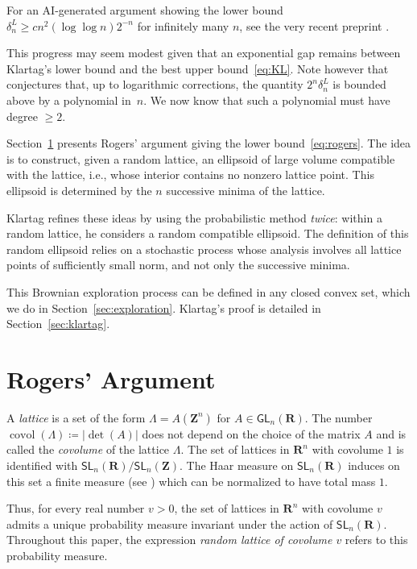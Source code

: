 \documentclass[10pt,a4paper]{amsart}
\newcommand{\R}{\mathbf{R}}
\newcommand{\Z}{\mathbf{Z}}
\newcommand{\gGL}{\mathsf{GL}}
\newcommand{\gSL}{\mathsf{SL}}
\DeclareMathOperator{\covol}{covol}
\renewcommand{\geq}{\geqslant}
\begin{document}
For an AI-generated argument showing the lower bound $\delta_n^L \geq c n^2 (\log \log n) 2^{-n}$ for infinitely many $n$, see the very recent preprint \cite{AGZ26}.

 
This progress may seem modest given that an exponential gap remains between Klartag's lower bound and the best upper bound~\eqref{eq:KL}. Note however that \cite{Venkatesh13} conjectures that, up to logarithmic corrections, the quantity $2^n \delta_n^L$ is bounded above by a polynomial in~$n$. We now know that such a polynomial must have degree $\geq 2$.
 
Section~\ref{section:rogers} presents Rogers' argument giving the lower bound~\eqref{eq:rogers}. The idea is to construct, given a random lattice, an ellipsoid of large volume compatible with the lattice, i.e., whose interior contains no nonzero lattice point. This ellipsoid is determined by the $n$ successive minima of the lattice.
 
Klartag refines these ideas by using the probabilistic method \emph{twice}: within a random lattice, he considers a random compatible ellipsoid. The definition of this random ellipsoid relies on a stochastic process whose analysis involves all lattice points of sufficiently small norm, and not only the successive minima.
 
This Brownian exploration process can be defined in any closed convex set, which we do in Section~\ref{sec:exploration}. Klartag's proof is detailed in Section~\ref{sec:klartag}.
 
 
\section{Rogers' Argument} \label{section:rogers}
 
A \emph{lattice} is a set of the form $\Lambda = A ( \Z^n)$ for $A \in \gGL_n(\R)$. The number $\covol(\Lambda) \coloneqq |\det(A)|$ does not depend on the choice of the matrix $A$ and is called the \emph{covolume} of the lattice $\Lambda$. The set of lattices in $\R^n$ with covolume $1$ is identified with $\gSL_n(\R) / \gSL_n(\Z)$. The Haar measure on $\gSL_n(\R)$ induces on this set a finite measure (see \cite[Section~2.2]{Benoist09}) which can be normalized to have total mass $1$.
 
Thus, for every real number $v>0$, the set of lattices in $\R^n$ with covolume $v$ admits a unique probability measure invariant under the action of $\gSL_n(\R)$. Throughout this paper, the expression \emph{random lattice of covolume $v$} refers to this probability measure.
 
\end{document}
